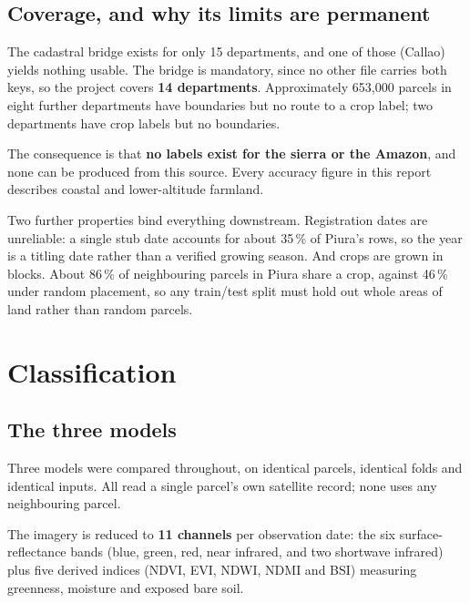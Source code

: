 \documentclass[11pt,a4paper]{article}
\begin{document}
\subsection{Coverage, and why its limits are permanent}

The cadastral bridge exists for only 15 departments, and one of those (Callao) yields nothing
usable. The bridge is mandatory, since no other file carries both keys, so the project covers
\textbf{14 departments}. Approximately 653{,}000 parcels in eight further departments have
boundaries but no route to a crop label; two departments have crop labels but no boundaries.

The consequence is that \textbf{no labels exist for the sierra or the Amazon}, and none can be
produced from this source. Every accuracy figure in this report describes coastal and
lower-altitude farmland.

Two further properties bind everything downstream. Registration dates are unreliable: a single
stub date accounts for about 35\,\% of Piura's rows, so the year is a titling date rather than a
verified growing season. And crops are grown in blocks. About 86\,\% of neighbouring parcels in
Piura share a crop, against 46\,\% under random placement, so any train/test split must hold out
whole areas of land rather than random parcels.

\section{Classification}

\subsection{The three models}

Three models were compared throughout, on identical parcels, identical folds and identical
inputs. All read a single parcel's own satellite record; none uses any neighbouring parcel.

The imagery is reduced to \textbf{11 channels} per observation date: the six surface-reflectance
bands (blue, green, red, near infrared, and two shortwave infrared) plus five derived indices
(NDVI, EVI, NDWI, NDMI and BSI) measuring greenness, moisture and exposed bare soil.
\end{document}

